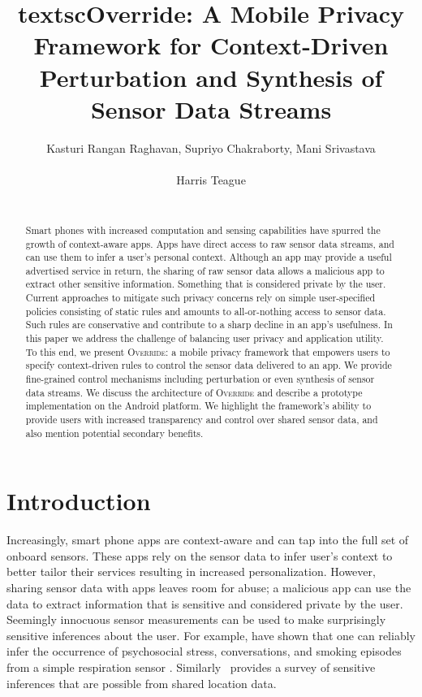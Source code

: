 \documentclass[10pt]{sensys-proc}
\author{
\alignauthor Kasturi Rangan Raghavan, Supriyo Chakraborty, Mani Srivastava\\
	\affaddr{University of California, Los Angeles}\\
	\email{\{kasturir,supriyo,mani\}@ucla.edu}
\alignauthor Harris Teague\\
	\affaddr{Qualcomm Inc.}\\
	\email{hteague@qualcomm.com}
}
\title{textsc{Override}: A Mobile Privacy Framework for Context-Driven
Perturbation and Synthesis of Sensor Data Streams}
\begin{document}
\maketitle

\begin{abstract}
Smart phones with increased computation and sensing capabilities have spurred the growth of context-aware apps. Apps have direct access to raw sensor data streams, and can use them to infer a user's personal context. Although an app may provide a useful advertised service in return, the sharing of raw sensor data allows a malicious app to extract other sensitive information. Something that is considered private by the user. Current approaches to mitigate such privacy concerns rely on simple user-specified policies consisting of static rules and amounts to all-or-nothing access to sensor data. Such rules are conservative and contribute to a sharp decline in an app's usefulness. In this paper we address the challenge of balancing user privacy and application utility. To this end, we present \textsc{Override}: a mobile privacy framework that empowers users to specify context-driven rules to control the sensor data delivered to an app. We provide fine-grained control mechanisms including perturbation or even synthesis of sensor data streams. We discuss the architecture of \textsc{Override} and describe a prototype implementation on the Android platform. We highlight the framework's ability to provide users with increased transparency and control over shared sensor data, and also mention potential secondary benefits.
\end{abstract}

\section{Introduction}
\label{sec:intro}
Increasingly, smart phone apps are context-aware and can tap into the full set of onboard sensors. These apps rely on the sensor data to infer user's context to better tailor their services resulting in increased personalization. However, sharing sensor data with apps leaves room for abuse; a malicious app can use the data to extract information that is sensitive and considered private by the user. Seemingly innocuous sensor measurements can be used to make surprisingly sensitive inferences about the user. For example, \cite{plarre:psychological, rahman:mConverse} have shown that one can reliably infer the occurrence of psychosocial stress, conversations, and smoking episodes from a simple respiration sensor
\cite{Ertin:AutoSense}. Similarly~\cite{krumm:survey} provides a survey of sensitive inferences that are possible from shared location data.
\end{document}
